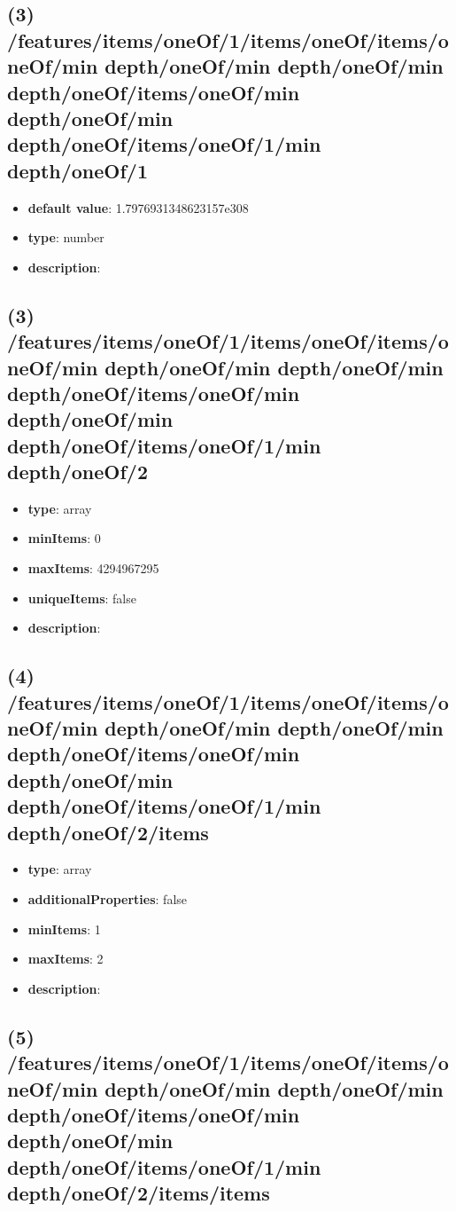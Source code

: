 \subsection{(3) /features/items/oneOf/1/items/oneOf/items/oneOf/min depth/oneOf/min depth/oneOf/min depth/oneOf/items/oneOf/min depth/oneOf/min depth/oneOf/items/oneOf/1/min depth/oneOf/1}
\begin{itemize}[leftmargin=3em]\item {\bf default value}: 1.7976931348623157e308
\item {\bf type}: number
\item {\bf description}: 
\end{itemize}\subsection{(3) /features/items/oneOf/1/items/oneOf/items/oneOf/min depth/oneOf/min depth/oneOf/min depth/oneOf/items/oneOf/min depth/oneOf/min depth/oneOf/items/oneOf/1/min depth/oneOf/2}
\begin{itemize}[leftmargin=3em]\item {\bf type}: array
\item {\bf minItems}: 0
\item {\bf maxItems}: 4294967295
\item {\bf uniqueItems}: false
\item {\bf description}: 
\end{itemize}\subsection{(4) /features/items/oneOf/1/items/oneOf/items/oneOf/min depth/oneOf/min depth/oneOf/min depth/oneOf/items/oneOf/min depth/oneOf/min depth/oneOf/items/oneOf/1/min depth/oneOf/2/items}
\begin{itemize}[leftmargin=4em]\item {\bf type}: array
\item {\bf additionalProperties}: false
\item {\bf minItems}: 1
\item {\bf maxItems}: 2
\item {\bf description}: 
\end{itemize}\subsection{(5) /features/items/oneOf/1/items/oneOf/items/oneOf/min depth/oneOf/min depth/oneOf/min depth/oneOf/items/oneOf/min depth/oneOf/min depth/oneOf/items/oneOf/1/min depth/oneOf/2/items/items}
